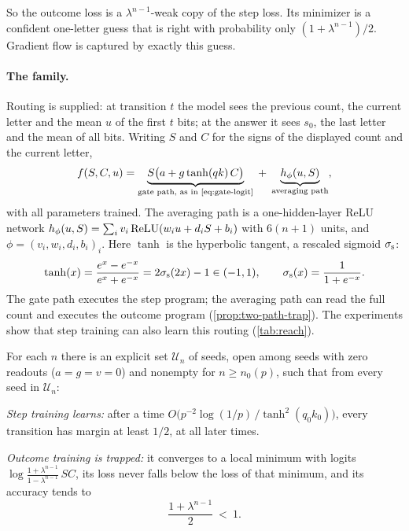 So the outcome loss is a $\lambda^{n-1}$-weak copy of the step loss. Its minimizer is a confident one-letter guess that is
right with probability only $(1+\lambda^{n-1})/2$. Gradient flow is captured by exactly this guess.

\paragraph{The family.} Routing is supplied: at transition $t$ the model sees the previous count, the current letter
and the mean $u$ of the first $t$ bits; at the answer it sees $s_0$, the last letter and the mean of all bits. Writing $S$
and $C$ for the signs of the displayed count and the current letter,
\begin{equation}
 f(S,C,u)=\underbrace{S\bigl(a+g\tanh(qk)\,C\bigr)}_{\text{gate path, as in \cref{eq:gate-logit}}}
 \;+\;\underbrace{h_\phi(u,S)}_{\text{averaging path}},
 \label{eq:two-path-model}
\end{equation}
with all parameters trained. The averaging path is a one-hidden-layer ReLU network $h_\phi(u,S)=\sum_iv_i\operatorname{ReLU}(w_iu+d_iS+b_i)$
with $6(n+1)$ units, and $\phi=(v_i,w_i,d_i,b_i)_i$. Here $\tanh$ is the hyperbolic tangent, a rescaled sigmoid $\sigma_{\mathrm s}$:
\[
 \tanh(x)=\frac{e^{x}-e^{-x}}{e^{x}+e^{-x}}=2\sigma_{\mathrm s}(2x)-1\in(-1,1),\qquad \sigma_{\mathrm s}(x)=\frac1{1+e^{-x}} .
\]
The gate path executes the step program; the averaging path can read the full count and executes the outcome program
(\cref{prop:two-path-trap}). The experiments show that step training can also learn this routing (\cref{tab:reach}).

\begin{theorem}
\label{thm:matched}
For each $n$ there is an explicit set $\mathcal U_n$ of seeds, open among seeds with zero readouts ($a=g=v=0$) and
nonempty for $n\ge n_0(p)$, such that from every seed in $\mathcal U_n$:
\begin{thmparts}
\item \emph{Step training learns:} after a time $O\bigl(p^{-2}\log(1/p)\,/\tanh^2(q_0k_0)\bigr)$, every transition has margin
at least $1/2$, at all later times.
\item \emph{Outcome training is trapped:} it converges to a local minimum with logits $\log\frac{1+\lambda^{n-1}}{1-\lambda^{n-1}}\,SC$, its loss
never falls below the loss of that minimum, and its accuracy tends to
\[
 \frac{1+\lambda^{n-1}}2\ <\ 1 .
\]
\end{thmparts}
\end{theorem}

